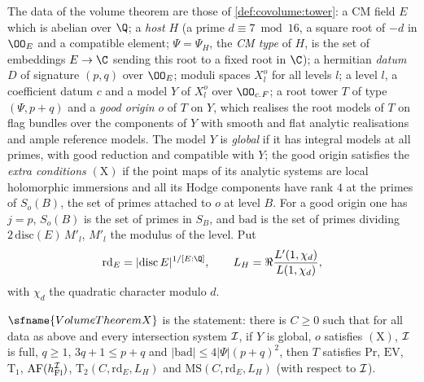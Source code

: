 The data of the volume theorem are those of \cref{def:covolume:tower}: a CM field $E$ which is abelian over
$\Q$; a \emph{host} $H$ (a prime $d\equiv7\bmod16$, a square root of $-d$ in $\OO_E$ and a compatible
element; $\Psi=\Psi_H$, the \emph{CM type} of $H$, is the set of embeddings $E\to\C$ sending this root to a fixed root in
$\C$); a hermitian \emph{datum} $D$ of signature $(p,q)$ over $\OO_E$; moduli spaces $X^o_l$ for all levels
$l$; a level $l$, a coefficient datum $c$ and a model $Y$ of $X^o_l$ over $\OO_{c.F}$; a root tower $T$ of
type $(\Psi,p+q)$ and a \emph{good origin} $o$ of $T$ on $Y$, which realises the root models of $T$ on flag
bundles over the components of $Y$ with smooth and flat analytic realisations and ample reference models. The
model $Y$ is \emph{global} if it has integral models at all primes, with good reduction and compatible with
$Y$; the good origin satisfies the \emph{extra conditions} $(\mathrm{X})$ if the point maps of its analytic
systems are local holomorphic immersions and all its Hodge components have rank $4$ at the primes of $S_o(B)$,
the set of primes attached to $o$ at level $B$. For a good origin one has $j=p$, $S_o(B)$ is the set of primes
in $S_B$, and $\mathrm{bad}$ is the set of primes dividing $2\,\mathrm{disc}(E)\,M'_l$, $M'_l$ the modulus of the
level. Put
\[
\mathrm{rd}_E=|\mathrm{disc}\,E|^{1/[E:\Q]},\qquad
L_H=\Re\frac{L'(1,\chi_d)}{L(1,\chi_d)},
\]
with $\chi_d$ the quadratic character modulo $d$.

\begin{definition}\label{pf:volthm:def:VolX}
$\sfname{VolumeTheoremX}$ is the statement: there is $C\ge0$ such that for all data as above and every
intersection system $\mathcal{I}$, if $Y$ is global, $o$ satisfies $(\mathrm{X})$, $\mathcal{I}$ is full, $q\ge1$,
$3q+1\le p+q$ and $|\mathrm{bad}|\le4|\Psi|(p+q)^2$, then $T$ satisfies $\mathrm{Pr}$,
$\mathrm{EV}$, $\mathrm{T}_1$, $\mathrm{AF}(h_{\mathrm{Fl}}^{\mathcal{I}})$, $\mathrm{T}_2(C,\mathrm{rd}_E,L_H)$ and
$\mathrm{MS}(C,\mathrm{rd}_E,L_H)$ (with respect to $\mathcal{I}$).
\end{definition}

